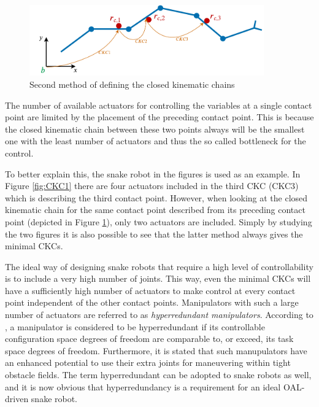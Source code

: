 \begin{figure}
    \centering
    \includegraphics[width=0.9\textwidth]{figures/theory/CKC2.pdf}
    \caption{Second method of defining the closed kinematic chains}
    \label{fig:CKC2}
\end{figure}

The number of available actuators for controlling the variables at a single contact point are limited by the placement of the preceding contact point. This is because the closed kinematic chain between these two points always will be the smallest one with the least number of actuators and thus the so called bottleneck for the control.

To better explain this, the snake robot in the figures is used as an example.
In Figure \ref{fig:CKC1} there are four actuators included in the third CKC (CKC3) which is describing the third contact point. However, when looking at the closed kinematic chain for the same contact point described from its preceding contact point (depicted in Figure \ref{fig:CKC2}), only two actuators are included. Simply by studying the two figures it is also possible to see that the latter method always gives the minimal CKCs.

The ideal way of designing snake robots that require a high level of controllability is to include a very high number of joints. This way, even the minimal CKCs will have a sufficiently high number of actuators to make control at every contact point independent of the other contact points. Manipulators with such a large number of actuators are referred to as \textit{hyperredundant manipulators}. According to \cite{chiaverini2008kinematically}, a manipulator is considered to be hyperredundant if its controllable configuration space degrees of freedom are comparable to, or exceed, its task space degrees of freedom. Furthermore, it is stated that such manupulators have an enhanced potential to use their extra joints for maneuvering within tight obstacle fields. The term hyperredundant can be adopted to snake robots as well, and it is now obvious that hyperredundancy is a requirement for an ideal OAL-driven snake robot.


